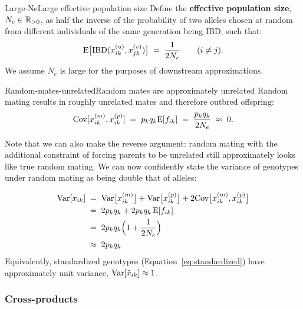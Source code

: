 \documentclass[12pt]{article}
\numberwithin{equation}{section}
\begin{document}
\begin{assumption}{Large-Ne}{Large effective population size}
Define the \textbf{effective population size}, $N_e \in \mathbb{R}_{>0}$, as half the inverse of the probability of two alleles chosen at random from different individuals of the same generation being IBD, such that:
$$ \mathrm{E}\big[\mathrm{IBD}(x^{(u)}_{ik}, x^{(v)}_{jk})\big] \;=\; \frac{1}{2 N_e} \qquad (i \neq j) . $$
We assume $N_e$ is large for the purposes of downstream approximations.
\end{assumption}

\begin{approximation}{Random-mates-unrelated}{Random mates are approximately unrelated}
Random mating results in roughly unrelated mates and therefore outbred offspring:
$$ \mathrm{Cov}[x^{(m)}_{ik}, x^{(p)}_{ik}] \;=\; p_k q_k \mathrm{E}[ f_{ik}] \;=\; \frac{p_k q_k}{2 N_e} \;\approx\; 0 . $$
\end{approximation}

Note that we can also make the reverse argument: random mating with the additional constraint of forcing parents to be unrelated still approximately looks like true random mating. 
We can now confidently state the variance of genotypes under random mating as being double that of alleles:

\begin{equation}\label{eq:var-x}
\begin{aligned}
    \mathrm{Var}[x_{ik}]
    \;&=\; \mathrm{Var}\big[x^{(m)}_{ik}\big] + \mathrm{Var}\big[x^{(p)}_{ik}\big] + 2\mathrm{Cov}\big[x^{(m)}_{ik}, x^{(p)}_{ik}\big] \\
    \;&=\; 2 p_k q_k + 2 p_k q_k\, \mathrm{E}[f_{ik}] \\
    \;&=\; 2 p_k q_k \Big(1 + \frac{1}{2 N_e}\Big) \\
    \;&\approx\; 2 p_k q_k
\end{aligned}
\end{equation}
Equivalently, standardized genotypes (Equation~\eqref{eq:standardized}) have approximately unit variance, $\mathrm{Var}[\tilde{x}_{ik}] \approx 1$.

\subsubsection{Cross-products}
\end{document}
